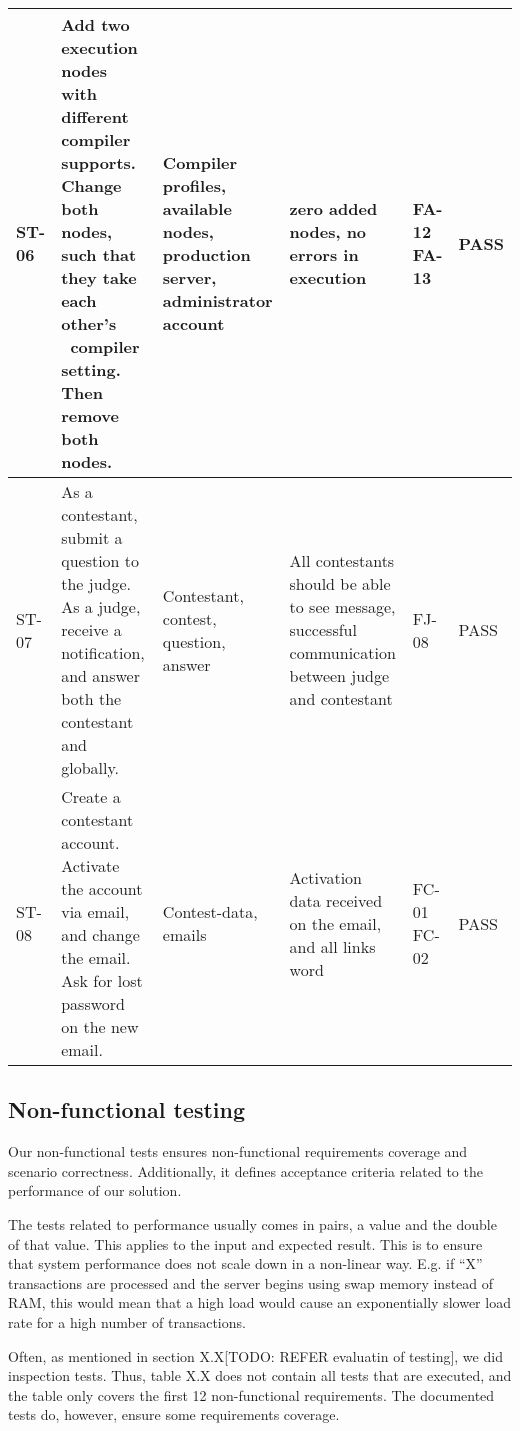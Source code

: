 \begin{longtable}{|l|p{3cm}|p{3cm}|p{3cm}|p{1.1cm}|l|}
ST-06 & Add two execution nodes with different compiler supports. Change both
nodes, such that they take each other's \ compiler setting. Then remove both
nodes. &
Compiler profiles, available nodes, production server, administrator account &
zero added nodes, no errors in execution & FA-12 FA-13 & PASS\\
\hline 

ST-07 & As a contestant, submit a question to the judge. As a judge, receive a
notification, and answer both the contestant and globally. &
Contestant, contest, question, answer &
All contestants should be able to see message, successful communication between
judge and contestant & FJ-08 & PASS\\
\hline

ST-08 & Create a contestant account. Activate the account via email, and change
the email. Ask for lost password on the new  email. &
Contest-data, emails & Activation data received on the email, and all links
word & FC-01 FC-02 & PASS\\
\hline
\end{longtable}


\subsection{Non-functional testing}
Our non-functional tests ensures non-functional requirements coverage
and scenario correctness. Additionally, it defines acceptance criteria
related to the performance of our solution.

The tests related to performance usually comes in pairs, a value and the
double of that value. This applies to the input and expected result.
This is to ensure that system performance does not scale down in a
non-linear way. E.g. if ``X''
transactions are processed and the server begins using swap memory
instead of RAM, this would mean that a high load would cause an
exponentially slower load rate for a high number of transactions.

Often, as mentioned in section X.X[TODO: REFER evaluatin of testing], we did
inspection tests. Thus, table X.X does not contain all tests that
are executed, and the table only covers the first 12 non-functional
requirements. The documented tests do, however, ensure some
requirements coverage.

